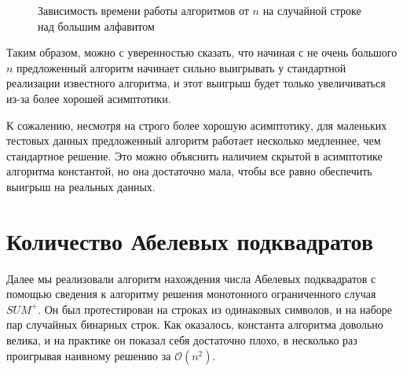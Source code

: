 \begin{figure}[h]
\caption{Зависимость времени работы алгоритмов от $n$ на случайной строке над большим алфавитом}
\end{figure}

Таким образом, можно с уверенностью сказать, что начиная с не очень большого $n$ предложенный алгоритм начинает сильно выигрывать у стандартной реализации известного алгоритма, и этот выигрыш будет только увеличиваться из-за более хорошей асимптотики.

К сожалению, несмотря на строго более хорошую асимптотику, для маленьких тестовых данных предложенный алгоритм работает несколько медленнее, чем стандартное решение. Это можно объяснить наличием скрытой в асимптотике алгоритма константой, но она достаточно мала, чтобы все равно обеспечить выигрыш на реальных данных.

\section{Количество Абелевых подквадратов}

Далее мы реализовали алгоритм нахождения числа Абелевых подквадратов с помощью сведения к алгоритму решения монотонного ограниченного случая $SUM^+$. Он был протестирован на строках из одинаковых символов, и на наборе пар случайных бинарных строк. Как оказалось, константа алгоритма довольно велика, и на практике он показал себя достаточно плохо, в несколько раз проигрывая наивному решению за $\mathcal{O}(n^2)$.

